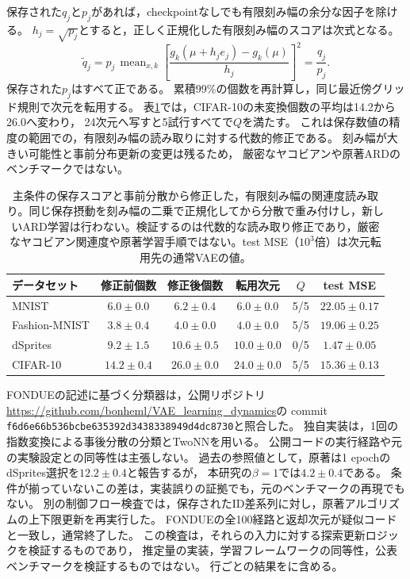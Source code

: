 \documentclass[11pt,a4paper]{ltjsarticle}
\begin{document}
保存された$q_j$と$p_j$があれば，checkpointなしでも有限刻み幅の余分な因子を除ける。
$h_j=\sqrt{p_j}$とすると，正しく正規化した有限刻み幅のスコアは次式となる。
\begin{equation}
 \widetilde q_j
 =p_j\,\operatorname{mean}_{x,k}
 \left[\frac{g_k(\mu+h_je_j)-g_k(\mu)}{h_j}\right]^2
 =\frac{q_j}{p_j}.
 \label{eq:ardcorrected}
\end{equation}
保存された$p_j$はすべて正である。
累積99\%の個数を再計算し，同じ最近傍グリッド規則で次元を転用する。
表\ref{tab:ard_normalized}では，CIFAR-10の未変換個数の平均は14.2から26.0へ変わり，
24次元へ写すと5試行すべてで$Q$を満たす。
これは保存数値の精度の範囲での，有限刻み幅の読み取りに対する代数的修正である。
刻み幅が大きい可能性と事前分布更新の変更は残るため，
厳密なヤコビアンや原著ARDのベンチマークではない。
\begin{table}[H]
\caption{主条件の保存スコアと事前分散から修正した，有限刻み幅の関連度読み取り。同じ保存摂動を刻み幅の二乗で正規化してから分散で重み付けし，新しいARD学習は行わない。検証するのは代数的な読み取り修正であり，厳密なヤコビアン関連度や原著学習手順ではない。test MSE（$10^3$倍）は次元転用先の通常VAEの値。}\label{tab:ard_normalized}
\small
\setlength{\tabcolsep}{3pt}
\begin{tabular*}{\textwidth}{@{\extracolsep{\fill}}lccccc@{}}
\toprule
データセット & 修正前個数 & 修正後個数 & 転用次元 & $Q$ & test MSE \\
\midrule
MNIST & $6.0 \pm 0.0$ & $6.2 \pm 0.4$ & $6.0 \pm 0.0$ & 5/5 & $22.05 \pm 0.17$ \\
Fashion-MNIST & $3.8 \pm 0.4$ & $4.0 \pm 0.0$ & $4.0 \pm 0.0$ & 5/5 & $19.06 \pm 0.25$ \\
dSprites & $9.2 \pm 1.5$ & $10.6 \pm 0.5$ & $10.0 \pm 0.0$ & 0/5 & $1.47 \pm 0.05$ \\
CIFAR-10 & $14.2 \pm 0.4$ & $26.0 \pm 0.0$ & $24.0 \pm 0.0$ & 5/5 & $15.36 \pm 0.13$ \\
\bottomrule\end{tabular*}
\end{table}

FONDUEの記述に基づく分類器は，公開リポジトリ
\url{https://github.com/bonheml/VAE_learning_dynamics}の
commit \texttt{f6d6e66b536bcbe635392d3438338949d4dc8730}と照合した。
独自実装は，1回の指数変換による事後分散の分類とTwoNNを用いる。
公開コードの実行経路や元の実験設定との同等性は主張しない。
過去の参照値として，原著は1 epochのdSprites選択を$12.2\pm0.4$と報告する\cite{bonheme2022fondue}が，
本研究の$\beta=1$では$4.2\pm0.4$である。
条件が揃っていないこの差は，実装誤りの証拠でも，元のベンチマークの再現でもない。
別の制御フロー検査では，保存されたID差系列に対し，原著アルゴリズムの上下限更新を再実行した。
FONDUEの全100経路と返却次元が疑似コードと一致し，通常終了した。
この検査は，それらの入力に対する探索更新ロジックを検証するものであり，
推定量の実装，学習フレームワークの同等性，公表ベンチマークを検証するものではない。
行ごとの結果をに含める。
\end{document}

